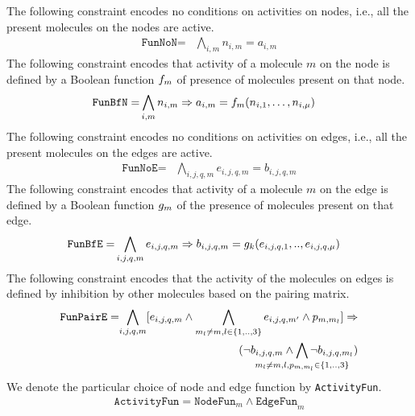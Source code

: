 The following constraint encodes no conditions on activities on nodes,
i.e., all the present molecules on the nodes are active.
\begin{align*}
\texttt{FunNoN} =& \bigwedge\limits_{i,m} n_{i,m} = a_{i,m}  
\end{align*}
The following constraint encodes that activity of a molecule $m$ on the node is
defined by a Boolean function $f_m$ of presence of molecules present on that node.
\begin{align*}
\texttt{FunBfN} =& \bigwedge\limits_{i,m} n_{i,m} \Rightarrow a_{i,m} =  f_m (n_{i,1},\dots,n_{i,\mu}) 
\end{align*}
The following constraint encodes no conditions on activities on edges,
i.e., all the present molecules on the edges are active.
\begin{align*}
 \texttt{FunNoE} =& \bigwedge\limits_{i,j,q,m} e_{i,j,q,m} = b_{i,j,q,m}
\end{align*}
The following constraint encodes that activity of a molecule $m$ on the edge is defined by a Boolean function $g_m$ of the presence of molecules present on that edge.
\begin{align*}
 \texttt{FunBfE} =& \bigwedge\limits_{i,j,q,m} e_{i,j,q,m} \Rightarrow b_{i,j,q,m} = g_k(e_{i,j,q,1}, .., e_{i,j,q,\mu} )
\end{align*}
%
The following constraint encodes that the activity of the molecules on
edges is defined by inhibition by other molecules based on the pairing
matrix. 
\begin{align*}
\texttt{FunPairE} =&	\begin{aligned}[t]
\bigwedge\limits_{i,j,q, m}  [e_{i,j,q,m} \land \bigwedge_{m_l \neq m,l \in \{1,..,3\}} e_{i,j,q,m'} \land p_{m, m_l}] \limplies\\
	(\neg b_{i,j,q,m} \land \bigwedge_{\mathclap{m_l \neq m,l, p_{m, m_l} \in \{1,..,3\}}} \neg b_{i,j,q,m_l})\end{aligned}\\
\end{align*}
%
We denote the particular choice of node and edge function by \texttt{ActivityFun}.
\begin{align*}
\texttt{ActivityFun} = \texttt{NodeFun}_m \land \texttt{EdgeFun}_m
\end{align*}
